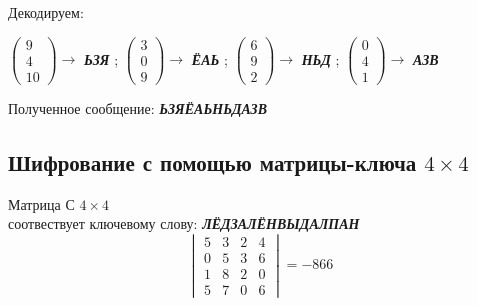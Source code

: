 \documentclass[a5paper, 10pt]{article}
\theoremstyle{definition}
\theoremstyle{plain}
\theoremstyle{remark}
\begin{document}
Декодируем:
\begin{center}
 $ \begin{pmatrix}
 9\\
4\\
10
\end{pmatrix} \to$ \textbf{\textit{ЬЗЯ}} ;
 $ \begin{pmatrix}
 3\\
0 \\
9
\end{pmatrix} \to$ \textbf{\textit{ЁАЬ}} ;
 $ \begin{pmatrix}
 6\\
9\\
2
\end{pmatrix} \to$ \textbf{\textit{НЬД}} ;
 $ \begin{pmatrix}
 0\\
4\\
1
\end{pmatrix} \to$ \textbf{\textit{АЗВ}}  \\

\end{center}
Полученное сообщение:  \textbf{\textit{ЬЗЯЁАЬНЬДАЗВ}}

\subsection{Шифрование с помощью матрицы-ключа $4 \times 4$}
Матрица С $4 \times 4$  \\
соотвествует ключевому слову: \textbf{\textit{ЛЁДЗАЛЁНВЫДАЛПАН}}
\begin{equation}
\begin{vmatrix}
 5 & 3 & 2 & 4 \\
 0 & 5 & 3 & 6 \\
1& 8 & 2 & 0\\
 5 & 7 & 0 & 6
\end{vmatrix}
= -866
\end{equation}
\end{document}
